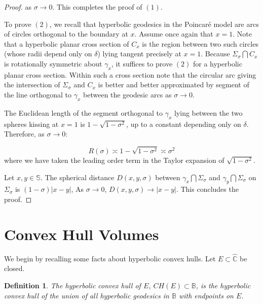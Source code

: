 \documentclass[11pt]{article}
\newtheorem{defi}[tm]{Definition}
\newcommand\comp{{\mathbb{C}}}
\newcommand\ball{{\mathbb{B}}}
\newcommand\sph{{\mathbb{S}}}
\begin{document}
\begin{proof}
 as $\sigma \rightarrow 0$. This completes the proof of $(1)$. 

 \bigskip

    To prove $(2)$, we recall that hyperbolic geodesics in the Poincar\'{e} model are arcs of circles orthogonal to the boundary at $x$. Assume once again that $x = 1$. Note that a hyperbolic planar cross section of $C_x$ is the region between two such circles (whose radii depend only on $\delta$) lying tangent precisely at $x = 1$. Because $\Sigma_\sigma \bigcap C_x$ is rotationally symmetric about $\gamma_x$, it suffices to prove $(2)$ for a hyperbolic planar cross section.  Within such a cross section note that the circular arc giving the intersection of $\Sigma_\sigma$ and $C_x$ is better and better approximated by segment of the line orthogonal to $\gamma_x$ between the geodesic arcs as $\sigma \rightarrow 0$. %

    \bigskip

    The Euclidean length of the segment orthogonal to $\gamma_x$ lying between the two spheres kissing at $x=1$ is $1 - \sqrt{1 - \sigma^2}$, up to a constant depending only on $\delta$.  Therefore, as $\sigma \rightarrow 0$:

    $$R(\sigma) \asymp 1 - \sqrt{1 - \sigma^2} \asymp \sigma^2$$ where we have taken the leading order term in the Taylor expansion of $\sqrt{1 - \sigma^2}$. 

    \bigskip

    Let $x,y \in \sph$. The spherical distance $D(x,y,\sigma)$ between $\gamma_x \bigcap \Sigma_\sigma$ and $\gamma_y \bigcap \Sigma_\sigma$ on $\Sigma_\sigma$ is $(1 - \sigma)|x - y|$, As $\sigma \rightarrow 0$, $D(x,y,\sigma) \rightarrow |x - y|$. This concludes the proof.     
\end{proof} 




    \section{Convex Hull Volumes}

   We begin by recalling some facts about hyperbolic convex hulls. Let $E \subset \hat{\comp}$ be closed. 

    \begin{defi}
         The hyperbolic convex hull of $E$, $CH(E) \subset \ball$, is the hyperbolic convex hull of the union of all hyperbolic geodesics in $\ball$ with endpoints on $E$.
         \end{defi}
    
\end{document}
